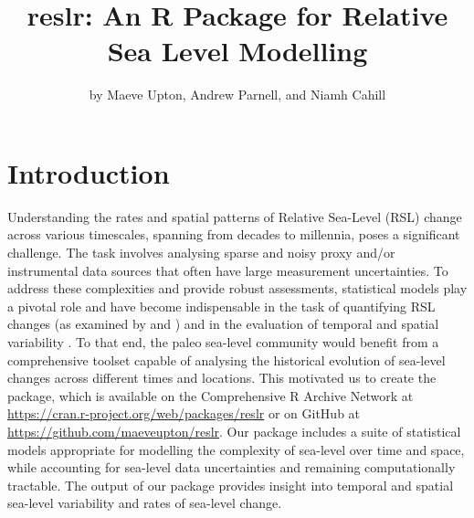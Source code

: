 \title{reslr: An R Package for Relative Sea Level Modelling}


\author{by Maeve Upton, Andrew Parnell, and Niamh Cahill}

\maketitle


\section{Introduction}\label{introduction}

Understanding the rates and spatial patterns of Relative Sea-Level (RSL) change across various timescales, spanning from decades to millennia, poses a significant challenge. The task involves analysing sparse and noisy proxy and/or instrumental data sources that often have large measurement uncertainties. To address these complexities and provide robust assessments, statistical models play a pivotal role and have become indispensable in the task of quantifying RSL changes (as examined by \citet{Cahill2015aStats} and \citet{Khan2015}) and in the evaluation of temporal and spatial variability \citep[e.g.,][]{Kopp2013, Kopp2016, Kemp2018, Walker2021}. To that end, the paleo sea-level community would benefit from a comprehensive toolset capable of analysing the historical evolution of sea-level changes across different times and locations. This motivated us to create the  package, which is available on the Comprehensive R Archive Network at \url{https://cran.r-project.org/web/packages/reslr} or on GitHub at \url{https://github.com/maeveupton/reslr}. Our package includes a suite of statistical models appropriate for modelling the complexity of sea-level over time and space, while accounting for sea-level data uncertainties and remaining computationally tractable. The output of our package provides insight into temporal and spatial sea-level variability and rates of sea-level change.

